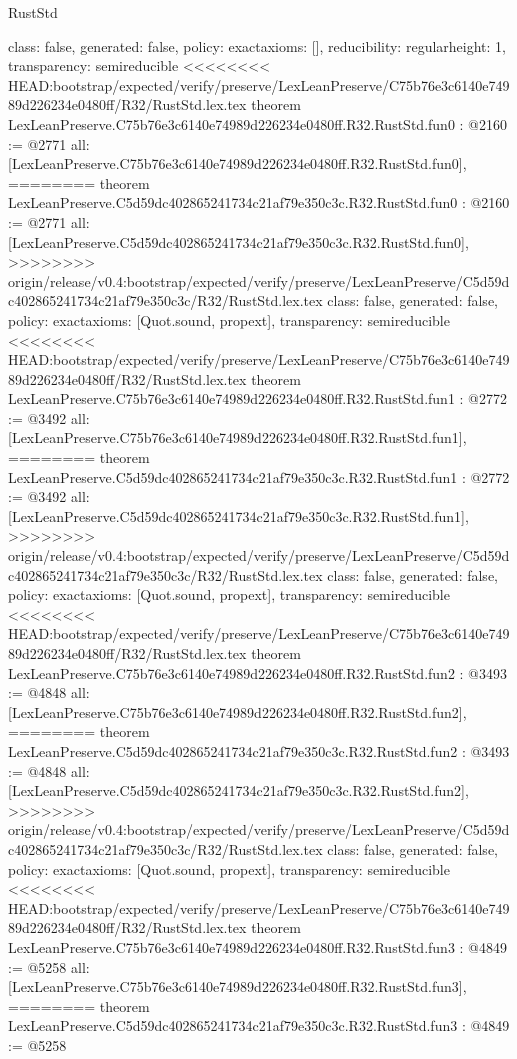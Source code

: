 \begin{lexlean}{RustStd}
\begin{coremodule}
{\begin{coremodule}
{{{  class: false,
  generated: false,
  policy: exact{axioms: []},
  reducibility: regular{height: 1},
  transparency: semireducible
}
<<<<<<<< HEAD:bootstrap/expected/verify/preserve/LexLeanPreserve/C75b76e3c6140e74989d226234e0480ff/R32/RustStd.lex.tex
theorem LexLeanPreserve.C75b76e3c6140e74989d226234e0480ff.R32.RustStd.fun0 : @2160 := @2771 {
  all: [LexLeanPreserve.C75b76e3c6140e74989d226234e0480ff.R32.RustStd.fun0],
========
theorem LexLeanPreserve.C5d59dc402865241734c21af79e350c3c.R32.RustStd.fun0 : @2160 := @2771 {
  all: [LexLeanPreserve.C5d59dc402865241734c21af79e350c3c.R32.RustStd.fun0],
>>>>>>>> origin/release/v0.4:bootstrap/expected/verify/preserve/LexLeanPreserve/C5d59dc402865241734c21af79e350c3c/R32/RustStd.lex.tex
  class: false,
  generated: false,
  policy: exact{axioms: [Quot.sound, propext]},
  transparency: semireducible
}
<<<<<<<< HEAD:bootstrap/expected/verify/preserve/LexLeanPreserve/C75b76e3c6140e74989d226234e0480ff/R32/RustStd.lex.tex
theorem LexLeanPreserve.C75b76e3c6140e74989d226234e0480ff.R32.RustStd.fun1 : @2772 := @3492 {
  all: [LexLeanPreserve.C75b76e3c6140e74989d226234e0480ff.R32.RustStd.fun1],
========
theorem LexLeanPreserve.C5d59dc402865241734c21af79e350c3c.R32.RustStd.fun1 : @2772 := @3492 {
  all: [LexLeanPreserve.C5d59dc402865241734c21af79e350c3c.R32.RustStd.fun1],
>>>>>>>> origin/release/v0.4:bootstrap/expected/verify/preserve/LexLeanPreserve/C5d59dc402865241734c21af79e350c3c/R32/RustStd.lex.tex
  class: false,
  generated: false,
  policy: exact{axioms: [Quot.sound, propext]},
  transparency: semireducible
}
<<<<<<<< HEAD:bootstrap/expected/verify/preserve/LexLeanPreserve/C75b76e3c6140e74989d226234e0480ff/R32/RustStd.lex.tex
theorem LexLeanPreserve.C75b76e3c6140e74989d226234e0480ff.R32.RustStd.fun2 : @3493 := @4848 {
  all: [LexLeanPreserve.C75b76e3c6140e74989d226234e0480ff.R32.RustStd.fun2],
========
theorem LexLeanPreserve.C5d59dc402865241734c21af79e350c3c.R32.RustStd.fun2 : @3493 := @4848 {
  all: [LexLeanPreserve.C5d59dc402865241734c21af79e350c3c.R32.RustStd.fun2],
>>>>>>>> origin/release/v0.4:bootstrap/expected/verify/preserve/LexLeanPreserve/C5d59dc402865241734c21af79e350c3c/R32/RustStd.lex.tex
  class: false,
  generated: false,
  policy: exact{axioms: [Quot.sound, propext]},
  transparency: semireducible
}
<<<<<<<< HEAD:bootstrap/expected/verify/preserve/LexLeanPreserve/C75b76e3c6140e74989d226234e0480ff/R32/RustStd.lex.tex
theorem LexLeanPreserve.C75b76e3c6140e74989d226234e0480ff.R32.RustStd.fun3 : @4849 := @5258 {
  all: [LexLeanPreserve.C75b76e3c6140e74989d226234e0480ff.R32.RustStd.fun3],
========
theorem LexLeanPreserve.C5d59dc402865241734c21af79e350c3c.R32.RustStd.fun3 : @4849 := @5258 {
}}}}}}}
\end{coremodule}}
\end{coremodule}
\end{lexlean}
